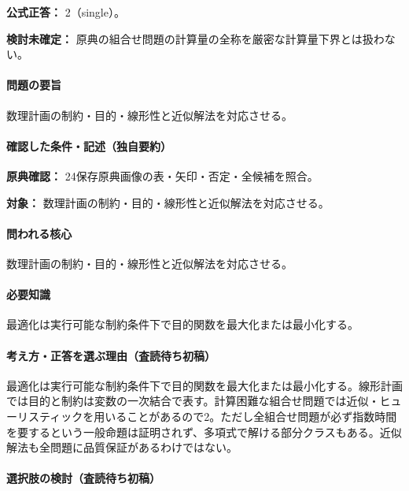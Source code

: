 \textbf{公式正答：} 2（single）。

\par\textbf{検討未確定：} 原典の組合せ問題の計算量の全称を厳密な計算量下界とは扱わない。

\paragraph{問題の要旨} 数理計画の制約・目的・線形性と近似解法を対応させる。

\paragraph{確認した条件・記述（独自要約）}\mbox{}\par

\noindent\textbf{原典確認：} 24保存原典画像の表・矢印・否定・全候補を照合。\par

\noindent\textbf{対象：} 数理計画の制約・目的・線形性と近似解法を対応させる。\par

\paragraph{問われる核心} 数理計画の制約・目的・線形性と近似解法を対応させる。

\paragraph{必要知識} 最適化は実行可能な制約条件下で目的関数を最大化または最小化する。

\paragraph{考え方・正答を選ぶ理由（査読待ち初稿）} 最適化は実行可能な制約条件下で目的関数を最大化または最小化する。線形計画では目的と制約は変数の一次結合で表す。計算困難な組合せ問題では近似・ヒューリスティックを用いることがあるので2。ただし全組合せ問題が必ず指数時間を要するという一般命題は証明されず、多項式で解ける部分クラスもある。近似解法も全問題に品質保証があるわけではない。

\paragraph{選択肢の検討（査読待ち初稿）}\mbox{}\par


